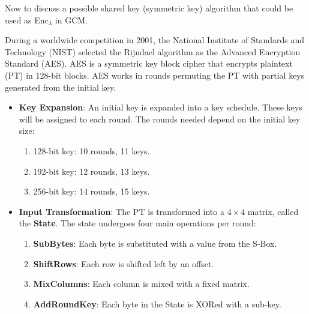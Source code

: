 Now to discuss a possible shared key (symmetric key) algorithm that could be used as Enc$_\lambda$ in GCM.
\begin{Def}

    \label{theo:aes}
    During a worldwide competition in 2001, the National Institute of Standards and Technology (NIST) selected the Rijndael algorithm as the Advanced Encryption Standard (AES).
    AES is a symmetric key block cipher that encrypts plaintext (PT) in 128-bit blocks. AES works in rounds permuting the PT with partial keys generated from the initial key.
    \begin{itemize}
        \item \textbf{Key Expansion}: An initial key is expanded into a key schedule. These keys will be assigned to each round. 
        The rounds needed depend on the initial key size:
        \begin{enumerate}
            \item 128-bit key: 10 rounds, 11 keys.
            \item 192-bit key: 12 rounds, 13 keys.
            \item 256-bit key: 14 rounds, 15 keys.
        \end{enumerate}
        \item \textbf{Input Transformation}: The PT is transformed into a $4\times4$ matrix, called the \textbf{State}. The 
        state undergoes four main operations per round:
        \begin{enumerate}
            \item \textbf{SubBytes}: Each byte is substituted with a value from the S-Box.
            \item \textbf{ShiftRows}: Each row is shifted left by an offset.
            \item \textbf{MixColumns}: Each column is mixed with a fixed matrix.
            \item \textbf{AddRoundKey}: Each byte in the State is XORed with a sub-key. \hfill \cite{satish2024aes} \cite{nist_aes2001} \cite{brainkartAES2018}
        \end{enumerate}
    \end{itemize}

    
\end{Def}

\newpage 

